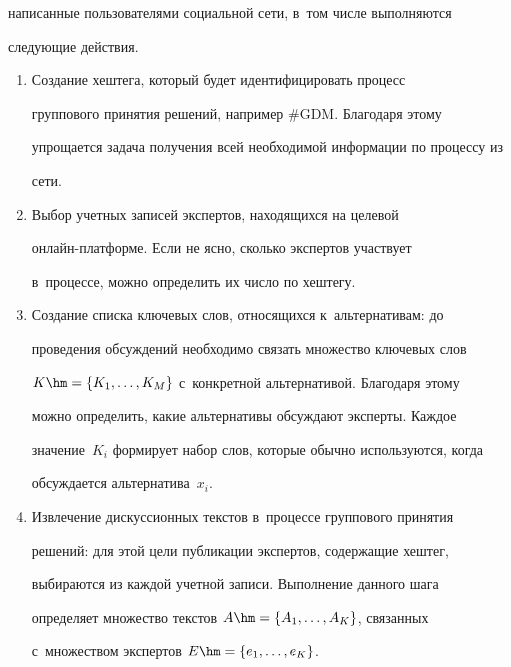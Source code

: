 написанные пользователями социальной сети, в~том числе выполняются 


следующие действия.


  \begin{enumerate}[1.]


  \item Создание хештега, который будет идентифицировать процесс 


группового принятия решений, например \#GDM. Благодаря этому 


упрощается задача получения всей необходимой информации по процессу из 


сети. 


  \item  Выбор учетных записей экспертов, находящихся на целевой  


он\-лайн-плат\-фор\-ме. Если не ясно, сколько экспертов участвует 


в~процессе, можно определить их число по хештегу. 


  \item Создание списка ключевых слов, относящихся к~альтернативам: до 


проведения обсуждений необходимо связать множество ключевых слов 


$K\hm= \{K_1, \ldots , K_M\}$ с~конкретной альтернативой. Благодаря этому 


можно определить, какие альтернативы обсуждают эксперты. Каждое 


значение~$K_i$ формирует набор слов, которые обычно используются, когда 


обсуждается альтернатива~$x_i$.


  \item Извлечение дискуссионных текстов в~процессе группового принятия 


решений: для этой цели публикации экспертов, содержащие хештег, 


выбираются из каждой учетной записи. Выполнение данного шага 


определяет множество текстов $A\hm= \{A_1, \ldots , A_K\}$, связанных 


с~множеством экспертов $E\hm= \{e_1, \ldots , e_K\}$.


  \end{enumerate}


  








